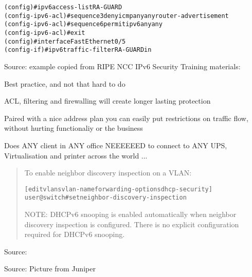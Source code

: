 \documentclass[Screen16to9,17pt]{foils}
\begin{document}


\begin{alltt}
 (config)#ipv6 access-list RA-GUARD
 (config-ipv6-acl)#sequence 3 deny icmp any any router-advertisement
 (config-ipv6-acl)#sequence 6 permit ipv6 any any
 (config-ipv6-acl)#exit
 (config)#interface FastEthernet0/5
 (config-if)#ipv6 traffic-filter RA-GUARD in
\end{alltt}
Source: example copied from RIPE NCC IPv6 Security Training materials:\\

\begin{list2}
\item Best practice, and not that hard to do
\item ACL, filtering and firewalling will create longer lasting protection
\item Paired with a nice address plan you can easily put restrictions on traffic flow, without hurting functionaliy or the business
\item Does ANY client in ANY office NEEEEEED to connect to ANY UPS, Virtualisation and printer across the world ...
\end{list2}




\begin{quote}
To enable neighbor discovery inspection on a VLAN:
\begin{alltt}
[edit vlans vlan-name forwarding-options dhcp-security]
user@switch# set  neighbor-discovery-inspection
\end{alltt}

NOTE: DHCPv6 snooping is enabled automatically when neighbor discovery inspection is configured. There is no explicit configuration required for DHCPv6 snooping.
\end{quote}
Source: 



Source: Picture from Juniper {\small
{}}
\end{document}
